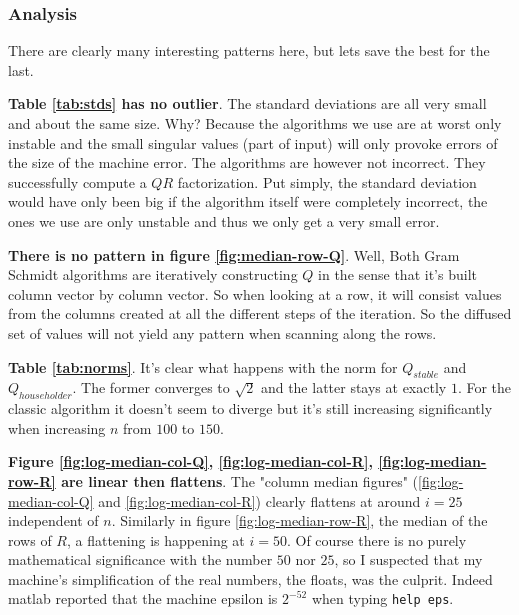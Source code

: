 \documentclass[a4paper,11pt]{article}
\begin{document}

\subsubsection{Analysis}

There are clearly many interesting patterns here, but lets save the best
for the last.

\textbf{Table \ref{tab:stds} has no outlier}. The standard deviations
are all very small and about the same size. Why? Because the algorithms
we use are at worst only instable and the small singular values (part of
input) will only provoke errors of the size of the machine error. The
algorithms are however not incorrect. They successfully compute a $QR$
factorization.  Put simply, the standard deviation would have only been
big if the algorithm itself were completely incorrect, the ones we use
are only unstable and thus we only get a very small error.

\textbf{There is no pattern in figure \ref{fig:median-row-Q}}. Well, Both
Gram Schmidt algorithms are iteratively constructing $Q$ in the sense
that it's built column vector by column vector. So when looking at a row,
it will consist values from the columns created at all the different
steps of the iteration. So the diffused set of values will not yield any
pattern when scanning along the rows.

\textbf{Table \ref{tab:norms}}. It's clear what happens with the norm
for $Q_{stable}$ and $Q_{householder}$. The former converges to $\sqrt{2}$
and the latter stays at exactly $1$. For the classic algorithm it
doesn't seem to diverge but it's still increasing significantly when
increasing $n$ from $100$ to $150$.

\textbf{Figure \ref{fig:log-median-col-Q}, \ref{fig:log-median-col-R},
\ref{fig:log-median-row-R} are linear then flattens}. The
"column median figures" (\ref{fig:log-median-col-Q} and
\ref{fig:log-median-col-R}) clearly flattens at around $i=25$
independent of $n$. Similarly in figure \ref{fig:log-median-row-R}, the
median of the rows of $R$, a flattening is happening at $i=50$. Of
course there is no purely mathematical significance with the number $50$
nor $25$, so I suspected that my machine's simplification of the real
numbers, the floats, was the culprit. Indeed matlab reported that
the machine epsilon is $2^{-52}$ when typing \texttt{help eps}.
\end{document}
